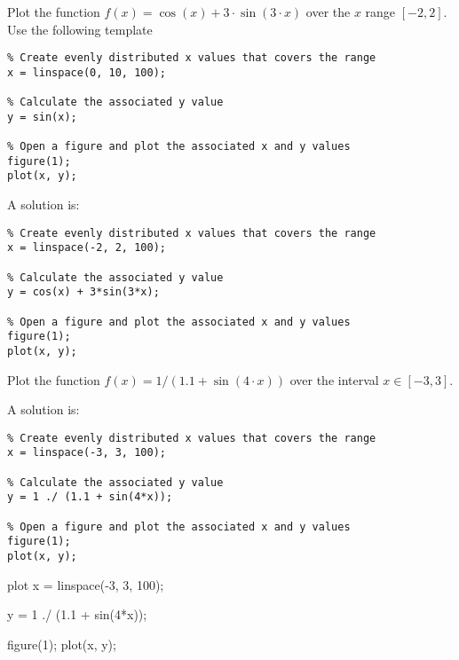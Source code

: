 \begin{ex}
Plot the function $f(x) = \cos(x) + 3 \cdot \sin(3 \cdot x)$
over the $x$ range $[-2, 2]$.
Use the following template 
\begin{lstlisting}
% Create evenly distributed x values that covers the range
x = linspace(0, 10, 100);

% Calculate the associated y value
y = sin(x);

% Open a figure and plot the associated x and y values
figure(1);
plot(x, y);
\end{lstlisting}
\begin{sol}
A solution is:
\begin{lstlisting}
% Create evenly distributed x values that covers the range
x = linspace(-2, 2, 100);

% Calculate the associated y value
y = cos(x) + 3*sin(3*x);

% Open a figure and plot the associated x and y values
figure(1);
plot(x, y);
\end{lstlisting}
\end{sol}
\end{ex}



\begin{ex}
Plot the function $f(x) = 1 / (1.1 + \sin(4 \cdot x))$
over the interval $x \in [-3, 3]$.
\begin{sol}
A solution is:
\begin{lstlisting}
% Create evenly distributed x values that covers the range
x = linspace(-3, 3, 100);

% Calculate the associated y value
y = 1 ./ (1.1 + sin(4*x));

% Open a figure and plot the associated x and y values
figure(1);
plot(x, y);
\end{lstlisting}
\end{sol}
\begin{solutionfile}{plot}
x = linspace(-3, 3, 100);

y = 1 ./ (1.1 + sin(4*x));

figure(1);
plot(x, y);
\end{solutionfile}
\end{ex}
